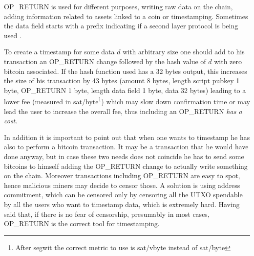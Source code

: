 OP\_RETURN is used for different purposes, writing raw data on the chain, adding information related to assets linked to a coin or timestamping. Sometimes the data field starts with a prefix indicating if a second layer protocol is being used \cite{DBLP:conf/fc/BartolettiP17}. 

To create a timestamp for some data $d$ with arbitrary size one should add to his transaction an OP\_RETURN change followed by the hash value of $d$ with zero bitcoin associated. If the hash function used has a 32 bytes output, this increases the size of his transaction by 43 bytes (amount 8 bytes, length script pubkey 1 byte, OP\_RETURN 1 byte, length data field 1 byte, data 32 bytes) leading to a lower fee (measured in sat/byte\footnote{After segwit the correct metric to use is sat/vbyte instead of sat/byte}) which may slow down confirmation time or may lead the user to increase the overall fee, thus including an OP\_RETURN \textit{has a cost}.

In addition it is important to point out that when one wants to timestamp he has also to perform a bitcoin transaction. It may be a transaction that he would have done anyway, but in case these two needs does not coincide he has to send some bitcoins to himself adding the OP\_RETURN change to actually write something on the chain.
Moreover transactions including OP\_RETURN are easy to spot, hence malicious miners may decide to censor those. A solution is using address commitment, which can be censored only by censoring all the UTXO spendable by all the users who want to timestamp data, which is extremely hard.
Having said that, if there is no fear of censorship, presumably in most cases, OP\_RETURN is the correct tool for timestamping.